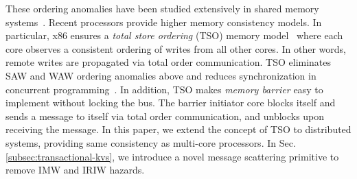 These ordering anomalies have been studied extensively in shared memory systems~\cite{gharachorloo1990memory}. Recent processors provide higher memory consistency models. In particular, x86 ensures a \textit{total store ordering} (TSO) memory model~\cite{sewell2010x86} where each core observes a consistent ordering of writes from all other cores. In other words, remote writes are propagated via total order communication. TSO eliminates SAW and WAW ordering anomalies above and reduces synchronization in concurrent programming~\cite{morrison2013fast,tassarotti2015verifying}. In addition, TSO makes \textit{memory barrier} easy to implement without locking the bus. The barrier initiator core blocks itself and sends a message to itself via total order communication, and unblocks upon receiving the message. In this paper, we extend the concept of TSO to distributed systems, providing same consistency as multi-core processors. In Sec.\ref{subsec:transactional-kvs}, we introduce a novel message scattering primitive to remove IMW and IRIW hazards. %

